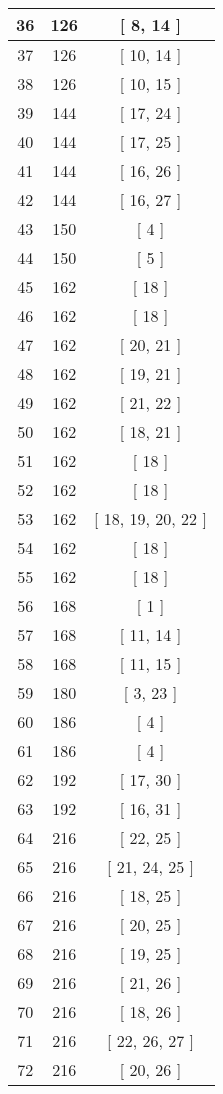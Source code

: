 \begin{center}
\begin{longtable}[H]{|| c c c ||}
36 & 126 & [ 8, 14 ] \\ 
\hline
37 & 126 & [ 10, 14 ] \\ 
\hline
38 & 126 & [ 10, 15 ] \\ 
\hline
39 & 144 & [ 17, 24 ] \\ 
\hline
40 & 144 & [ 17, 25 ] \\ 
\hline
41 & 144 & [ 16, 26 ] \\ 
\hline
42 & 144 & [ 16, 27 ] \\ 
\hline
43 & 150 & [ 4 ] \\ 
\hline
44 & 150 & [ 5 ] \\ 
\hline
45 & 162 & [ 18 ] \\ 
\hline
46 & 162 & [ 18 ] \\ 
\hline
47 & 162 & [ 20, 21 ] \\ 
\hline
48 & 162 & [ 19, 21 ] \\ 
\hline
49 & 162 & [ 21, 22 ] \\ 
\hline
50 & 162 & [ 18, 21 ] \\ 
\hline
51 & 162 & [ 18 ] \\ 
\hline
52 & 162 & [ 18 ] \\ 
\hline
53 & 162 & [ 18, 19, 20, 22 ] \\ 
\hline
54 & 162 & [ 18 ] \\ 
\hline
55 & 162 & [ 18 ] \\ 
\hline
56 & 168 & [ 1 ] \\ 
\hline
57 & 168 & [ 11, 14 ] \\ 
\hline
58 & 168 & [ 11, 15 ] \\ 
\hline
59 & 180 & [ 3, 23 ] \\ 
\hline
60 & 186 & [ 4 ] \\ 
\hline
61 & 186 & [ 4 ] \\ 
\hline
62 & 192 & [ 17, 30 ] \\ 
\hline
63 & 192 & [ 16, 31 ] \\ 
\hline
64 & 216 & [ 22, 25 ] \\ 
\hline
65 & 216 & [ 21, 24, 25 ] \\ 
\hline
66 & 216 & [ 18, 25 ] \\ 
\hline
67 & 216 & [ 20, 25 ] \\ 
\hline
68 & 216 & [ 19, 25 ] \\ 
\hline
69 & 216 & [ 21, 26 ] \\ 
\hline
70 & 216 & [ 18, 26 ] \\ 
\hline
71 & 216 & [ 22, 26, 27 ] \\ 
\hline
72 & 216 & [ 20, 26 ] \\ 

\end{longtable}
\end{center}
